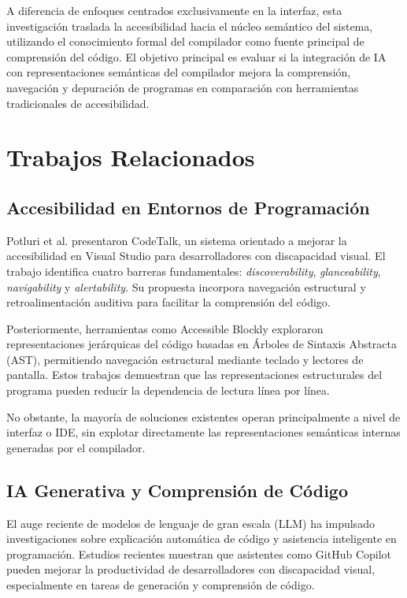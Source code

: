 \documentclass[conference]{IEEEtran}
\begin{document}
A diferencia de enfoques centrados exclusivamente en la interfaz, esta investigación traslada la accesibilidad hacia el núcleo semántico del sistema, utilizando el conocimiento formal del compilador como fuente principal de comprensión del código. El objetivo principal es evaluar si la integración de IA con representaciones semánticas del compilador mejora la comprensión, navegación y depuración de programas en comparación con herramientas tradicionales de accesibilidad.
\section{Trabajos Relacionados}

\subsection{Accesibilidad en Entornos de Programación}

Potluri et al. \cite{codetalk} presentaron CodeTalk, un sistema orientado a mejorar la accesibilidad en Visual Studio para desarrolladores con discapacidad visual. El trabajo identifica cuatro barreras fundamentales: \textit{discoverability}, \textit{glanceability}, \textit{navigability} y \textit{alertability}. Su propuesta incorpora navegación estructural y retroalimentación auditiva para facilitar la comprensión del código.

Posteriormente, herramientas como Accessible Blockly \cite{accessible_blockly} exploraron representaciones jerárquicas del código basadas en Árboles de Sintaxis Abstracta (AST), permitiendo navegación estructural mediante teclado y lectores de pantalla. Estos trabajos demuestran que las representaciones estructurales del programa pueden reducir la dependencia de lectura línea por línea.

No obstante, la mayoría de soluciones existentes operan principalmente a nivel de interfaz o IDE, sin explotar directamente las representaciones semánticas internas generadas por el compilador.

\subsection{IA Generativa y Comprensión de Código}

El auge reciente de modelos de lenguaje de gran escala (LLM) ha impulsado investigaciones sobre explicación automática de código y asistencia inteligente en programación. Estudios recientes \cite{genai_accessibility} muestran que asistentes como GitHub Copilot pueden mejorar la productividad de desarrolladores con discapacidad visual, especialmente en tareas de generación y comprensión de código.
\end{document}
